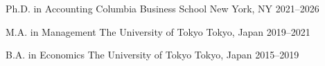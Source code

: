 

\begin{cventries}
    \cventry
    {Ph.D. in Accounting} %
    {Columbia Business School} %
    {New York, NY} %
    {2021--2026} %
    {}

    \cventry
    {M.A. in Management} %
    {The University of Tokyo} %
    {Tokyo, Japan} %
    {2019--2021} %
    {}

    \cventry
    {B.A. in Economics} %
    {The University of Tokyo} %
    {Tokyo, Japan} %
    {2015--2019} %
    {}

\end{cventries}
